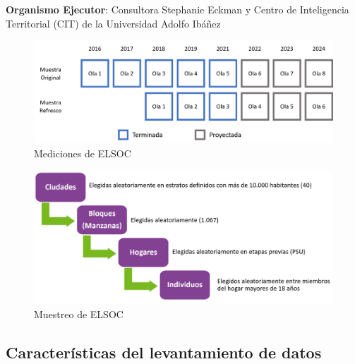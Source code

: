 \documentclass[
  12pt,
]{book}
\begin{document}
\textbf{Organismo Ejecutor}: Consultora Stephanie Eckman y Centro de Inteligencia Territorial (CIT) de la Universidad Adolfo Ibáñez

\begin{figure}

{\centering \includegraphics[width=1\linewidth,height=1\textheight]{../inputs/imagenes/olas_elsoc} 

}

\caption{Mediciones de ELSOC}\label{fig:ilust-olas-elsoc}
\end{figure}

\begin{figure}

{\centering \includegraphics[width=1\linewidth,height=1\textheight]{../inputs/imagenes/etapas_seleccion} 

}

\caption{Muestreo de ELSOC}\label{fig:ilust-etapas-seleccion}
\end{figure}

\hypertarget{caracteruxedsticas-del-levantamiento-de-datos}{%
\subsection*{Características del levantamiento de datos}\label{caracteruxedsticas-del-levantamiento-de-datos}}
\end{document}
